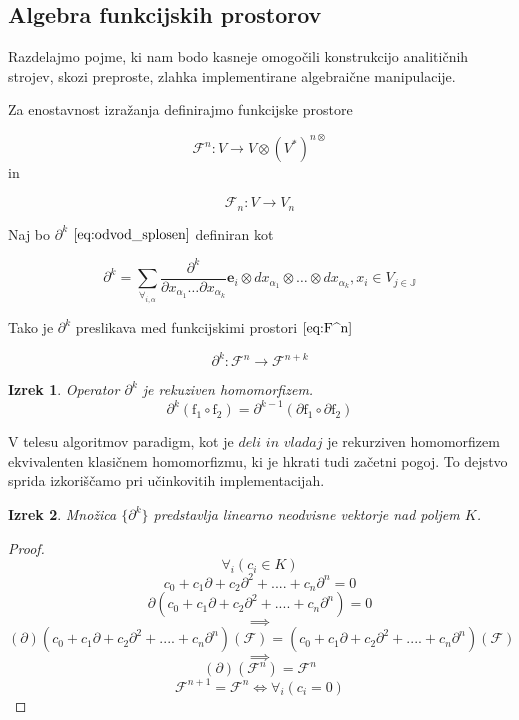 \documentclass{article}
\newcommand{\JJ}{\mathbb{J}}
\newcommand{\e}{\mathbf{e}}
\newcommand{\F}{\mathcal{F}}
\newcommand{\D}{\partial}
\newtheorem{izrek}{Izrek}[section]
\begin{document}
\subsection{Algebra funkcijskih prostorov}

Razdelajmo pojme, ki nam bodo kasneje omogočili konstrukcijo analitičnih strojev, skozi preproste, zlahka implementirane algebraične manipulacije.

Za enostavnost izražanja definirajmo funkcijske prostore

 \begin{equation}\label{eq:F^n}
 	\F^n:V\to V\otimes(V^*)^{n\otimes}
 \end{equation}
 in
 
 \begin{equation}\label{eq:F_n}
 	\F_n:V\to V_n
 \end{equation}
 
Naj bo $\D^k$ $\eqref{eq:odvod_splosen}$ definiran kot

\begin{equation}\label{eq:dd}
	\partial^k=\sum_{\forall_{i,\alpha}}\frac{\partial^k}{\partial
	    x_{\alpha_1}\ldots \partial x_{\alpha_k}}\e_i\otimes
	  dx_{\alpha_1}\otimes\ldots \otimes dx_{\alpha_k} , x_i\in V_{j\in\JJ}
\end{equation}

Tako je $\D^k$ preslikava med funkcijskimi prostori $\eqref{eq:F^n}$
 
 \begin{equation}\label{eq:toFn+k}
 \D^k:\F^n\to\F^{n+k}
 \end{equation}
 
 \begin{izrek}
 	Operator $\D^k$ je rekuziven homomorfizem.
 	$$\D^k(\mathrm{f_1}\circ \mathrm{f_2})=\D^{k-1}(\D \mathrm{f_1}\circ\D \mathrm{f_2})$$
 \end{izrek}
 
 V telesu algoritmov paradigm, kot je $\textit{deli in vladaj}$ je rekurziven homomorfizem ekvivalenten klasičnem homomorfizmu, ki je hkrati tudi začetni pogoj. To dejstvo sprida izkoriščamo pri učinkovitih implementacijah.
 
 \begin{izrek}\label{izr:linearnaNeodvisnost}
  Množica $\{\partial^k\}$ predstavlja linearno neodvisne vektorje nad poljem $K$.
 \end{izrek}
 
 \begin{proof} 
 $$\forall_i(c_i\in K)$$
	  $$c_0+c_1\D+c_2\D^2+....+c_n\D^n=0$$
	$$\D(c_0+c_1\D+c_2\D^2+....+c_n\D^n)=0$$
	$$\implies$$
	$$(\D)(c_0+c_1\D+c_2\D^2+....+c_n\D^n)(\F)=(c_0+c_1\D+c_2\D^2+....+c_n\D^n)(\F)$$
	$$\implies$$
	$$(\D)(\F^n)=\F^n$$
	$$\F^{n+1}=\F^n\iff\forall_i(c_i=0)$$
	
 \end{proof}
 
\end{document}

